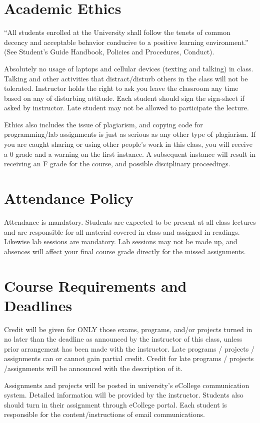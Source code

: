 \documentclass[11pt]{article}
\begin{document}
\section*{Academic Ethics}
\label{sec-8}


``All students enrolled at the University shall follow the tenets of
common decency and acceptable behavior conducive to a positive
learning environment.'' (See Student's Guide Handbook, Policies and
Procedures, Conduct). 

Absolutely no usage of laptops and cellular devices (texting and
talking) in class. Talking and other activities that distract/disturb
others in the class will not be tolerated. Instructor holds the right
to ask you leave the classroom any time based on any of disturbing
attitude. Each student should sign the sign-sheet if asked by
instructor. Late student may not be allowed to participate the
lecture.

Ethics also includes the issue of plagiarism, and copying code for
programming/lab assignments is just as serious as any other type of
plagiarism.  If you are caught sharing or using other people's work in
this class, you will receive a 0 grade and a warning on the first
instance.  A subsequent instance will result in receiving an F grade
for the course, and possible disciplinary proceedings.
\section*{Attendance Policy}
\label{sec-9}


Attendance is mandatory. Students are expected to be present at all
class lectures and are responsible for all material covered in class
and assigned in readings.  Likewise lab sessions are mandatory.  Lab
sessions may not be made up, and absences will affect your final
course grade directly for the missed assignments.
\section*{Course Requirements and Deadlines}
\label{sec-10}

Credit will be given for ONLY those exams, programs, and/or projects
turned in no later than the deadline as announced by the instructor of
this class, unless prior arrangement has been made with the
instructor. Late programs / projects / assignments can or cannot gain
partial credit. Credit for late programs / projects /assignments will be
announced with the description of it.

Assignments and projects will be posted in university’s eCollege
communication system. Detailed information will be provided by the
instructor. Students also should turn in their assignment through
eCollege portal. Each student is responsible for the
content/instructions of email communications.
\end{document}
